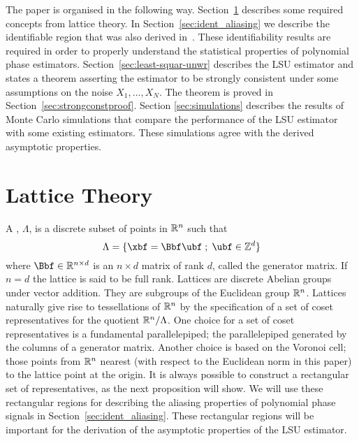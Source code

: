 \documentclass[journal]{IEEEtran}
\begin{document}
The paper is organised in the following way. Section~\ref{sec:lattice-theory} describes some required concepts from lattice theory.  In Section~\ref{sec:ident_aliasing} we describe the identifiable region that was also derived in~\cite{McKilliam2009IndentifiabliltyAliasingPolyphase}.  These identifiability results are required in order to properly understand the statistical properties of polynomial phase estimators.  Section~\ref{sec:least-squar-unwr} describes the LSU estimator and states a theorem asserting the estimator to be strongly consistent under some assumptions on the noise $X_1,\dots,X_N$. The theorem is proved in Section~\ref{sec:strongconstproof}.  Section \ref{sec:simulations} describes the results of Monte Carlo simulations that compare the performance of the LSU estimator with some existing estimators.  These simulations agree with the derived asymptotic properties.



\section{Lattice Theory}\label{sec:lattice-theory}

A ,  $\Lambda$, is a discrete subset of points in ${\mathbb R}^n$ such that
\[
   \Lambda = \{\xbf = \Bbf\ubf \mid \ubf \in \ints^d \}
\]
where $\Bbf \in \reals^{n \times d}$ is an $n \times d$ matrix of rank $d$, called the generator matrix.  If $n = d$ the lattice is said to be full rank.  Lattices are discrete Abelian groups under vector addition.  They are subgroups of the Euclidean group ${\mathbb R}^n$.  Lattices naturally give rise to tessellations of ${\mathbb R}^n$ by the specification of a set of coset representatives for the quotient ${\mathbb R}^n / \Lambda$.  One choice for a set of coset representatives is a fundamental parallelepiped; the parallelepiped generated by the columns of a generator matrix.  Another choice is based on the Voronoi cell; those points from ${\mathbb R}^n$ nearest (with respect to the Euclidean norm in this paper) to the lattice point at the origin.  It is always possible to construct a rectangular set of representatives, as the next proposition will show.  We will use these rectangular regions for describing the aliasing properties of polynomial phase signals in Section~\ref{sec:ident_aliasing}.  These rectangular regions will be important for the derivation of the asymptotic properties of the LSU estimator.
\end{document}
